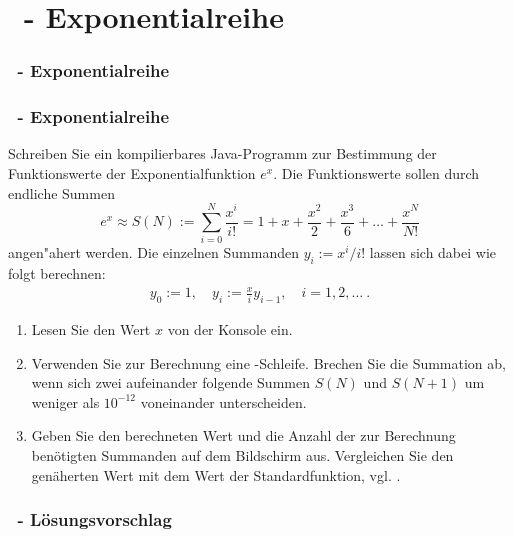 \def\stitle{\theexercise\ - Exponentialreihe}
\section{\stitle}
\begin{frame}
  \frametitle{\stitle}%
\tableofcontents[current]
\end{frame}


\begin{frame}%
  \frametitle{\stitle}%

Schreiben Sie ein kompilierbares Java-Programm zur Bestimmung der Funktionswerte der Exponentialfunktion $e^x$.
Die Funktionswerte sollen durch endliche Summen
\[
  e^x \approx S(N):=\sum_{i=0}^{N} \frac{x^i}{i!}=
  1+x+\frac{x^2}{2}+\frac{x^3}{6}+\ldots+\frac{x^N}{N!}
\]
angen"ahert werden.
Die einzelnen Summanden $y_i := x^i/i! $ lassen sich dabei wie folgt berechnen: 
\begin{align*}
  y_0 := 1, \quad 
  y_i := \frac{x}{i}y_{i-1}, \quad i = 1,2,\ldots \ .
\end{align*}

\begin{enumerate}
  \item Lesen Sie den Wert $x$ von der Konsole ein.
  \item Verwenden Sie zur Berechnung eine -Schleife.
        Brechen Sie die Summation ab, wenn sich zwei aufeinander folgende Summen $S(N)$ und $S(N+1)$ um weniger als $10^{-12}$ voneinander unterscheiden.
  \item Geben Sie den berechneten Wert und die Anzahl der zur Berechnung ben\"otigten Summanden auf dem Bildschirm aus.
        Vergleichen Sie den gen\"aherten Wert mit dem Wert der Standardfunktion, vgl. .
\end{enumerate}
\end{frame}


\begin{frame}%
  \frametitle{\theexercise\ - L\"osungsvorschlag}%

\end{frame}
